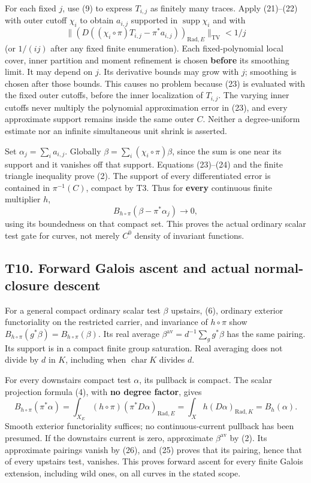 \documentclass[
  10pt,
]{article}
\begin{document}
For each fixed \(j\), use (9) to express \(T_{i,j}\) as finitely many
traces. Apply (21)--(22) with outer cutoff \(\chi_i\) to obtain
\(a_{i,j}\) supported in \(\operatorname{supp}\chi_i\) and with \[
 \big\|(D((\chi_i\circ\pi)T_{i,j}-\pi^*a_{i,j}))_{
                     \mathrm{Rad},E}\big\|_{\mathrm{TV}}<1/j       \tag{24}
\] (or \(1/(ij)\) after any fixed finite enumeration). Each
fixed-polynomial local cover, inner partition and moment refinement is
chosen \textbf{before} its smoothing limit. It may depend on \(j\). Its
derivative bounds may grow with \(j\); smoothing is chosen after those
bounds. This causes no problem because (23) is evaluated with the fixed
outer cutoffs, before the inner localization of \(T_{i,j}\). The varying
inner cutoffs never multiply the polynomial approximation error in (23),
and every approximate support remains inside the same outer \(C\).
Neither a degree-uniform estimate nor an infinite simultaneous unit
shrink is asserted.

Set \(\alpha_j=\sum_i a_{i,j}\). Globally
\(\beta=\sum_i(\chi_i\circ\pi)\beta\), since the sum is one near its
support and it vanishes off that support. Equations (23)--(24) and the
finite triangle inequality prove (2). The support of every
differentiated error is contained in \(\pi^{-1}(C)\), compact by T3.
Thus for \textbf{every} continuous finite multiplier \(h\), \[
       B_{h\circ\pi}(\beta-\pi^*\alpha_j)\longrightarrow0,
                                                               \tag{25}
\] using its boundedness on that compact set. This proves the actual
ordinary scalar test gate for curves, not merely \(C^0\) density of
invariant functions.

\subsection{T10. Forward Galois ascent and actual normal-closure
descent}\label{t10.-forward-galois-ascent-and-actual-normal-closure-descent}

For a general compact ordinary scalar test \(\beta\) upstairs, (6),
ordinary exterior functoriality on the restricted carrier, and
invariance of \(h\circ\pi\) show
\(B_{h\circ\pi}(g^*\beta)=B_{h\circ\pi}(\beta)\). Its real average
\(\beta^{\mathrm{av}}=d^{-1}\sum_g g^*\beta\) has the same pairing. Its
support is in a compact finite group saturation. Real averaging does not
divide by \(d\) in \(K\), including when \(\operatorname{char}K\)
divides \(d\).

For every downstairs compact test \(\alpha\), its pullback is compact.
The scalar projection formula (4), with \textbf{no degree factor}, gives
\[
  B_{h\circ\pi}(\pi^*\alpha)
     =\int_{X_E}(h\circ\pi)(\pi^*D\alpha)_{\mathrm{Rad},E}
     =\int_X h(D\alpha)_{\mathrm{Rad},K}=B_h(\alpha).     \tag{26}
\] Smooth exterior functoriality suffices; no continuous-current
pullback has been presumed. If the downstairs current is zero,
approximate \(\beta^{\mathrm{av}}\) by (2). Its approximate pairings
vanish by (26), and (25) proves that its pairing, hence that of every
upstairs test, vanishes. This proves forward ascent for every finite
Galois extension, including wild ones, on all curves in the stated
scope.
\end{document}
